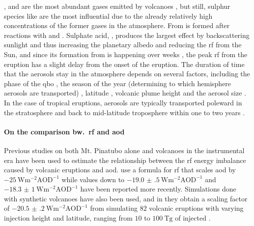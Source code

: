 \documentclass{ametsocV5}
\newcommand{\iso}[1][i]{{#1}njected \ce{SO2}}
\begin{document}
,  and  are the most abundant gases emitted by volcanoes
\citep{robock2000}, but still, sulphur species like  are the most influential
due to the already relatively high concentrations of the former gases in the atmosphere.
From   is formed after reactions with  and 
\citep{robock2000}. Sulphate acid, , produces the largest effect by
backscattering sunlight and thus increasing the planetary albedo and reducing the
\ac{rf} from the Sun, and since its formation from  is happening over weeks
\citep{robock2000}, the peak \ac{rf} from the eruption has a slight delay from the onset
of the eruption. The duration of time that the  aerosols stay in the
atmosphere depends on several factors, including the phase of the \ac{qbo}
\citep{pitari2016b}, the season of the year (determining to which hemisphere aerosols
are transported) \citep{toohey2011,toohey2019}, latitude \citep{marshall2019,
  toohey2019}, volcanic plume height \citep{marshall2019} and the aerosol size
\citep{marshall2019}. In the case of tropical eruptions, aerosols are typically
transported poleward in the stratosphere and back to mid-latitude troposphere within one
to two years \citep{robock2000}.


\paragraph*{On the comparison bw.\ \acs*{rf} and \acs*{aod}}

Previous studies on both Mt. Pinatubo alone \citep{mills2017,hansen2005} and volcanoes
in the instrumental era \citep{gregory2016} have been used to estimate the relationship
between the \ac{rf} energy imbalance caused by volcanic eruptions and \ac{aod}.
\citet{myhre2013} use a formula for \ac{rf} that scales \ac{aod} by
\(\SI{-25}{\watt\metre^{-2}\mathrm{AOD}^{-1}}\) while values down to
\(\SI{-19.0(5)}{\watt\metre^{-2}\mathrm{AOD}^{-1}}\) \citep{gregory2016} and
\(\SI{-18.3(10)}{\watt\metre^{-2}\mathrm{AOD}^{-1}}\) \citep{mills2017} have been
reported more recently. Simulations done with synthetic volcanoes have also been used,
and in \citet{marshall2020} they obtain a scaling factor of
\(\SI{-20.5(2)}{\watt\metre^{-2}\mathrm{AOD}^{-1}}\) from simulating \(82\) volcanic
eruptions with varying injection height and latitude, ranging from \(10\) to
\(\SI{100}{\tera\gram}\) of \iso{}.
\end{document}
